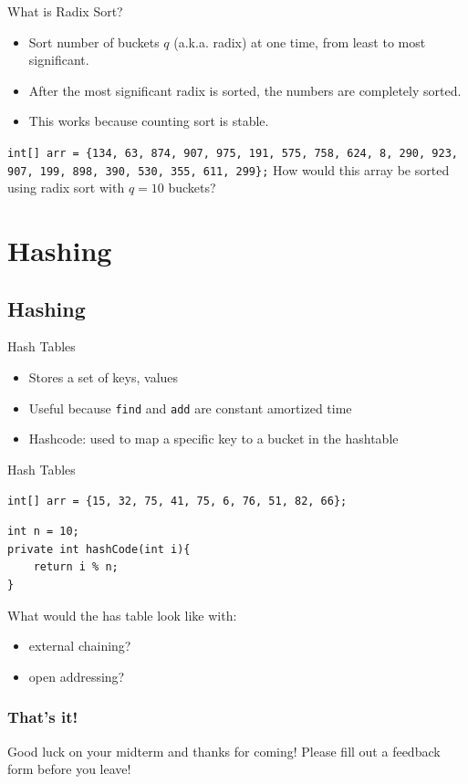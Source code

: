 \documentclass[9pt]{beamer}
\begin{document}
\begin{frame}{What is Radix Sort?}
\begin{itemize}
\item Sort number of buckets $q$ (a.k.a. radix) at one time, from least to most significant.
\item After the most significant radix is sorted, the numbers are completely sorted.
\item This works because counting sort is stable.
\end{itemize}


{\tt int[] arr = \{134, 63, 874, 907, 975, 191, 575, 758, 624, 8, 290, 923, 907, 199, 898, 390, 530, 355, 611, 299\};} \newline \newline
How would this array be sorted using radix sort with $q = 10$ buckets?
\end{frame}

\section{Hashing}
\subsection{Hashing}

\begin{frame}[fragile]{Hash Tables}
\begin{itemize}
\item Stores a set of keys, values
\item Useful because {\tt find} and {\tt add} are constant amortized time
\item Hashcode: used to map a specific key to a bucket in the hashtable
\end{itemize}
\end{frame}

\begin{frame}[fragile]{Hash Tables}

{\tt int[] arr = \{15, 32, 75, 41, 75, 6, 76, 51, 82, 66\};} \newline
 {
  \begin{lstlisting}
int n = 10;
private int hashCode(int i){
    return i % n;
}
  \end{lstlisting}
  }
What would the has table look like with:
\begin{itemize}
\item external chaining?
\item open addressing?
\end{itemize}
\end{frame}

\begin{frame}
  \frametitle{\huge{That's it!}}
\LARGE{Good luck on your midterm and thanks for coming! \newline
Please fill out a feedback form before you leave! \newline
}
\end{frame}
\end{document}
